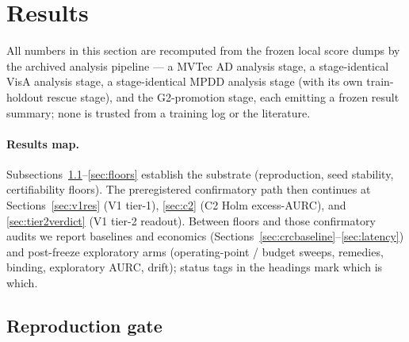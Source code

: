 \documentclass[preprint,11pt]{elsarticle}
\begin{document}
\section{Results}
\label{sec:results}

All numbers in this section are recomputed from the frozen local score dumps by the archived
analysis pipeline --- a MVTec AD analysis stage, a stage-identical VisA analysis stage, a
stage-identical MPDD analysis stage (with its own train-holdout rescue stage), and the
G2-promotion stage, each emitting a frozen result summary; none is trusted from a training log or
the literature.

\paragraph{Results map.}
Subsections~\ref{sec:repro}--\ref{sec:floors} establish the substrate (reproduction, seed
stability, certifiability floors). The preregistered confirmatory path then continues at
Sections~\ref{sec:v1res} (V1 tier-1), \ref{sec:c2} (C2 Holm excess-AURC), and
\ref{sec:tier2verdict} (V1 tier-2 readout). Between floors and those confirmatory audits we
report baselines and economics (Sections~\ref{sec:crcbaseline}--\ref{sec:latency}) and
post-freeze exploratory arms (operating-point / budget sweeps, remedies, binding, exploratory
AURC, drift); status tags in the headings mark which is which.

\subsection{Reproduction gate}
\label{sec:repro}
\end{document}
